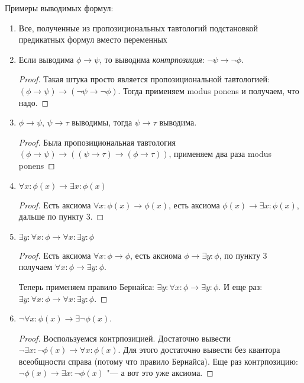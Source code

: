 \begin{exmp}
	Примеры выводимых формул:
	\begin{enumerate}
		\item Все, полученные из пропозициональных тавтологий подстановкой предикатных формул вместо переменных
		\item Если выводима $\phi \to \psi$, то выводима \textsl{контрпозиция}: $\lnot \psi \to \lnot \phi$.
			\begin{proof}
				Такая штука просто является пропозициональной тавтологией: $(\phi \to \psi) \to (\lnot \psi \to \lnot \phi)$.
				Тогда применяем modus ponens и получаем, что надо.
			\end{proof}
		\item $\phi \to \psi$, $\psi \to \tau$ выводимы, тогда $\psi \to \tau$ выводима.
			\begin{proof}
				Была пропозициональная тавтология $(\phi \to \psi) \to ((\psi \to \tau) \to (\phi \to \tau))$,
				применяем два раза modus ponens
			\end{proof}
		\item $\forall x \colon \phi(x) \to \exists x \colon \phi(x)$
			\begin{proof}
				Есть аксиома $\forall x \colon \phi(x) \to \phi(x)$,
				есть аксиома $\phi(x) \to \exists x \colon \phi(x)$,
				дальше по пункту 3.
			\end{proof}
		\item $\exists y \colon \forall x \colon \phi \to \forall x \colon \exists y \colon \phi$
			\begin{proof}
				Есть аксиома $\forall x \colon \phi \to \phi$,
				есть аксиома $\phi \to \exists y \colon \phi$,
				по пункту 3 получаем $\forall x \colon \phi \to \exists y \colon \phi$.

				Теперь применяем правило Бернайса: $\exists y \colon \forall x \colon \phi \to \exists y \colon \phi$.
				И еще раз: $\exists y \colon \forall x \colon \phi \to \forall x \colon \exists y \colon \phi$.
			\end{proof}
		\item $\lnot \forall x \colon \phi(x) \to \exists \lnot \phi(x)$.
			\begin{proof}
				Воспользуемся контрпозицией.
				Достаточно вывести $\lnot \exists x \colon \lnot \phi(x) \to \forall x \colon \phi(x)$.
				Для этого достаточно вывести без квантора всеобщности справа (потому что правило Бернайса).
				Еще раз контрпозицию: $\lnot \phi(x) \to \exists x \colon \lnot \phi(x)$ "--- а вот это уже аксиома.
			\end{proof}
	\end{enumerate}
\end{exmp}

